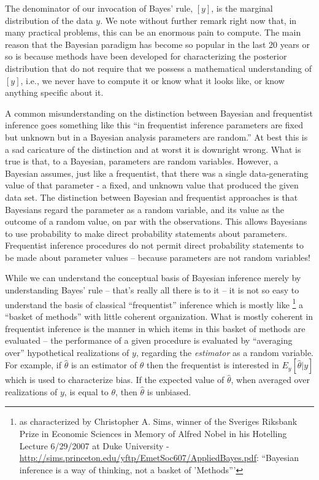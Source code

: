 The denominator of our invocation of Bayes' rule, $[y]$,
is the marginal distribution of the data $y$.  We note without further
remark right now that, in many practical problems, this can be an
enormous pain to compute. The main reason that the Bayesian paradigm
has become so popular in the last 20 years or so is because methods
have been developed
for characterizing the posterior distribution that do not
require that we possess a mathematical understanding of $[y]$, i.e.,
we never have to compute it or know what it looks like, or know
anything specific about it.

A common misunderstanding on the distinction between Bayesian and
frequentist inference goes something like this ``in frequentist
inference parameters are fixed but unknown but in a Bayesian analysis
parameters are random.'' At best this is a sad caricature of the
distinction and at worst it is downright wrong. What is true is that,
to a Bayesian, parameters are random variables. However, a Bayesian
assumes, just like a frequentist, that there was a single
data-generating value of that parameter - a fixed, and unknown value
that produced the given data set.
The distinction between Bayesian and frequentist approaches is that
Bayesians regard the parameter as a random variable, and its value as
the outcome of a random value, on par with the observations. This
allows Bayesians to use probability to make direct probability
statements about parameters. Frequentist inference procedures do not
permit direct probability statements to be made about parameter
values -- because parameters are not random variables!

While we can understand the conceptual basis of Bayesian inference
merely by understanding Bayes' rule -- that's really all there is to it
-- it is not so easy to understand the basis of classical
``frequentist'' inference which is mostly like
\footnote{as characterized by Christopher A. Sims, winner of the 
Sveriges Riksbank Prize in Economic Sciences in Memory of Alfred Nobel
in his
Hotelling Lecture 6/29/2007 at Duke University - 
\url{http://sims.princeton.edu/yftp/EmetSoc607/AppliedBayes.pdf}:
``Bayesian inference is a way of thinking,
not a basket of 'Methods'''} a ``basket of
methods'' with little coherent organization. What is mostly coherent
in frequentist inference is the manner in which items in this basket
of methods are evaluated -- the performance of a given procedure is
evaluated by ``averaging over'' hypothetical realizations of $y$,
regarding the {\it estimator} as a random variable. For example, if
$\hat{\theta}$ is an estimator of $\theta$ then the frequentist is
interested in $E_{y}[\hat{\theta}|y]$ which is used to characterize
bias. If the expected value of $\hat{\theta}$, when averaged over
realizations of $y$, is equal to $\theta$, then $\hat{\theta}$ is
unbiased.

